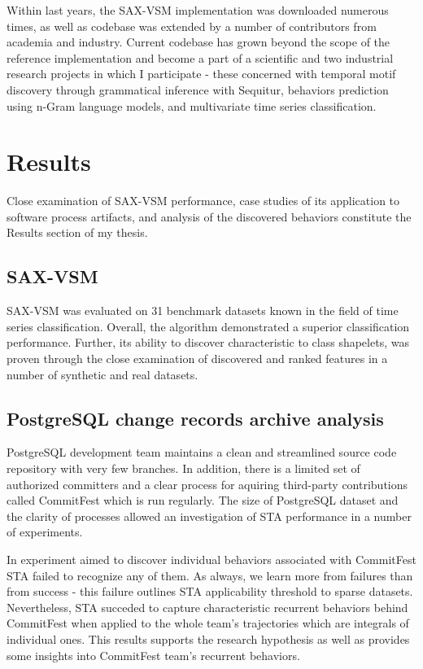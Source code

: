 \documentclass[12pt,oneside]{article}
\numberwithin{equation}{subsection}
\begin{document}
Within last years, the SAX-VSM implementation was downloaded numerous times, as well as codebase
was extended by a number of contributors from academia and industry. Current codebase has grown
beyond the scope of the reference implementation and become a part of a scientific and two
industrial research projects in which I participate - these concerned with temporal motif discovery
through grammatical inference with Sequitur, behaviors prediction using n-Gram language models, and
multivariate time series classification.

\section{Results}
Close examination of SAX-VSM performance, case studies of its application to software process
artifacts, and analysis of the discovered behaviors constitute the Results section of my thesis.

\subsection{SAX-VSM}
SAX-VSM was evaluated on 31 benchmark datasets known in the field of time series classification.
Overall, the algorithm demonstrated a superior classification performance. Further, its ability to
discover characteristic to class shapelets, was proven through the close examination of discovered
and ranked features in a number of synthetic and real datasets.

\subsection{PostgreSQL change records archive analysis}
PostgreSQL development team maintains a clean and streamlined source code repository with very few branches.
In addition, there is a limited set of authorized committers and a clear process for aquiring third-party contributions 
called CommitFest which is run regularly. The size of PostgreSQL dataset and the clarity of processes allowed 
an investigation of STA performance in a number of experiments. 

In experiment aimed to discover individual behaviors associated with CommitFest STA failed to recognize 
any of them. As always, we learn more from failures than from success - this failure outlines STA applicability
threshold to sparse datasets. Nevertheless, STA succeded to capture characteristic recurrent behaviors behind 
CommitFest when applied to the whole team's  trajectories which are integrals of individual ones. This results 
supports the research hypothesis as well as provides some insights into CommitFest team's recurrent behaviors.
\end{document}
